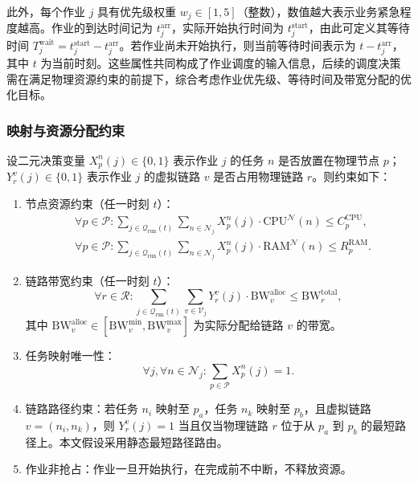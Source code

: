 此外，每个作业 $j$ 具有优先级权重 $w_j \in [1,5]$（整数），数值越大表示业务紧急程度越高。作业的到达时间记为 $t_j^{\text{arr}}$，实际开始执行时间为 $t_j^{\text{start}}$，由此可定义其等待时间 $T_j^{\text{wait}} = t_j^{\text{start}} - t_j^{\text{arr}}$。若作业尚未开始执行，则当前等待时间表示为 $t - t_j^{\text{arr}}$，其中 $t$ 为当前时刻。这些属性共同构成了作业调度的输入信息，后续的调度决策需在满足物理资源约束的前提下，综合考虑作业优先级、等待时间及带宽分配的优化目标。

\subsubsection{映射与资源分配约束}

设二元决策变量 $X_{p}^{n}(j) \in \{0,1\}$ 表示作业 $j$ 的任务 $n$ 是否放置在物理节点 $p$；$Y_{r}^{v}(j) \in \{0,1\}$ 表示作业 $j$ 的虚拟链路 $v$ 是否占用物理链路 $r$。则约束如下：

\begin{enumerate}[topsep = 0 pt, itemsep= 0 pt, parsep=0pt, partopsep=0pt, leftmargin=0pt, itemindent=48pt, labelsep=0pt, listparindent=24pt, label=（\arabic*）]
    \item 节点资源约束（任一时刻 $t$）：
    \begin{align}
        &\forall p \in \mathcal{P}: \sum_{j \in \mathcal{Q}_{\text{run}}(t)} \sum_{n \in \mathcal{N}_j} X_{p}^{n}(j) \cdot \text{CPU}^\mathcal{N}(n) \le C_p^{\text{CPU}}, \\
        &\forall p \in \mathcal{P}: \sum_{j \in \mathcal{Q}_{\text{run}}(t)} \sum_{n \in \mathcal{N}_j} X_{p}^{n}(j) \cdot \text{RAM}^\mathcal{N}(n) \le R_p^{\text{RAM}}.
    \end{align}
    
    \item 链路带宽约束（任一时刻 $t$）：
    \begin{equation}
        \forall r \in \mathcal{R}: \sum_{j \in \mathcal{Q}_{\text{run}}(t)} \sum_{v \in \mathcal{V}_j} Y_{r}^{v}(j) \cdot \text{BW}_v^{\text{alloc}} \le \text{BW}_r^{\text{total}},
    \end{equation}
    其中 $\text{BW}_v^{\text{alloc}} \in [\text{BW}_v^{\min}, \text{BW}_v^{\max}]$ 为实际分配给链路 $v$ 的带宽。
    
    \item 任务映射唯一性：
    \begin{equation}
        \forall j, \forall n \in \mathcal{N}_j: \sum_{p \in \mathcal{P}} X_{p}^{n}(j) = 1.
    \end{equation}
    
    \item 链路路径约束：若任务 $n_i$ 映射至 $p_a$，任务 $n_k$ 映射至 $p_b$，且虚拟链路 $v = (n_i, n_k)$，则 $Y_{r}^{v}(j)=1$ 当且仅当物理链路 $r$ 位于从 $p_a$ 到 $p_b$ 的最短路径上。本文假设采用静态最短路径路由。
    
    \item 作业非抢占：作业一旦开始执行，在完成前不中断，不释放资源。
\end{enumerate}

